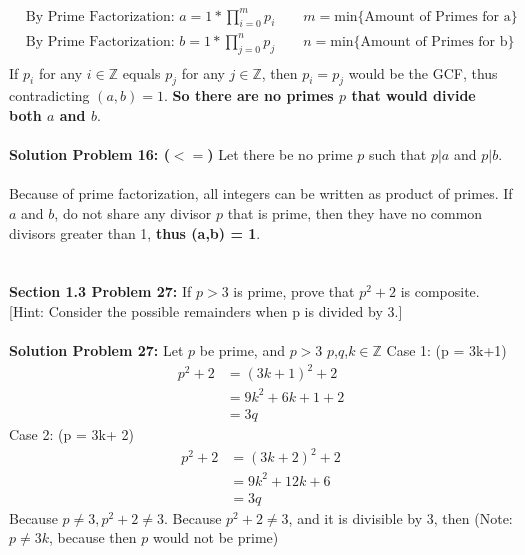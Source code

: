 \documentclass[12pt]{article}
\begin{document}
	\begin{align}
		&\text{By Prime Factorization: } a = 1*\prod_{i=0}^{m} p_i \qquad m = \text{min\{Amount of Primes for a\}} \\
		&\text{By Prime Factorization: } b = 1*\prod_{j=0}^{n} p_j \qquad n = \text{min\{Amount of Primes for b\}} \\
	\end{align}
If $p_i$ for any $i \in \mathbb{Z}$ equals $p_j$ for any $j \in \mathbb{Z}$, then $p_i = p_j$ would be the GCF, thus contradicting $(a, b) = 1$. \textbf{ \boldmath So there are no primes $p$ that would divide both $a$ and $b$}. 
\\\\
\noindent \textbf{Solution Problem 16: ($<=$)} Let there be no prime $p$ such that $p|a$ and $p|b$. 
\\\\
Because of prime factorization, all integers can be written as product of primes.  If $a$ and $b$, do not share any divisor $p$ that is prime, then they have no common divisors greater than 1,\textbf{ \boldmath thus (a,b) = 1}.
\\\\\\
\noindent \textbf{Section 1.3 Problem 27: }  If $p > 3$ is prime, prove that $p^2 + 2$ is composite. [Hint: Consider the possible remainders when p is divided by 3.] 
\\\\
\noindent \textbf{Solution Problem 27: } Let $p$ be prime, and $p>3$ \qquad $p$,$q$,$k \in \mathbb{Z}$ 
Case 1: (p = 3k+1)\begin{align}
					p^2 + 2 &= (3k+1)^2 + 2 \\
					&= 9k^2 + 6k + 1 + 2 \\
					&= 3q
				  \end{align}
Case 2: (p = 3k+ 2)\begin{align}
					p^2 + 2 &= (3k + 2)^2 + 2 \\
					&= 9k^2 + 12k + 6 \\
					&= 3q
				   \end{align}
Because $p\not = 3, p^2 + 2 \not = 3$.  Because $p^2 + 2 \not = 3$, and it is divisible by 3, then  (Note: $p \not = 3k$, because then $p$ would not be prime)
		
\end{document}
